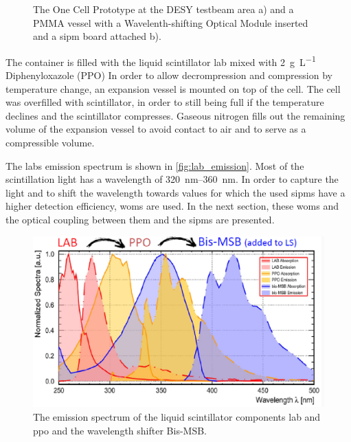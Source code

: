 \begin{figure}
\begin{subfigure}[b]{.54\textwidth}
		\caption[PMMA vessel]{}
		\label{fig:pmma_vessel}
	\end{subfigure}
	\caption[One Cell Prototype and PMMA vessel]{The One Cell Prototype at the DESY testbeam area a) and a PMMA vessel with a Wavelenth-shifting Optical Module inserted and a \ac{sipm} board attached b). \cite{}}
	\label{fig:one_cell_and_pmma}
\end{figure}

The container is filled with the liquid scintillator \ac{lab} mixed with \SI{2}{\gram\per\liter} Diphenyloxazole (PPO)%
In order to allow decrompression and compression by temperature change, an expansion vessel is mounted on top of the cell.
The cell was overfilled with scintillator, in order to still being full if the temperature declines and the scintillator compresses.
Gaseous nitrogen fills out the remaining volume of the expansion vessel to avoid contact to air and to serve as a compressible volume. 

The \ac{lab}s emission spectrum is shown in \autoref{fig:lab_emission}.
Most of the scintillation light has a wavelength of \SIrange{320}{360}{\nano\meter}.
In order to capture the light and to shift the wavelength towards values for which the used \acp{sipm} have a higher detection efficiency, \acp{wom} are used.
In the next section, these \acp{wom} and the optical coupling between them and the \acp{sipm} are presented.
\begin{figure}
	\centering
	\includegraphics[width=.8\textwidth]{pictures/lab_emission}
	\caption[LAB emission spectrum]{The emission spectrum of the liquid scintillator components \ac{lab} and \ac{ppo} and the wavelength shifter Bis-MSB. \cite{}}
	\label{fig:lab_emission}
\end{figure}



